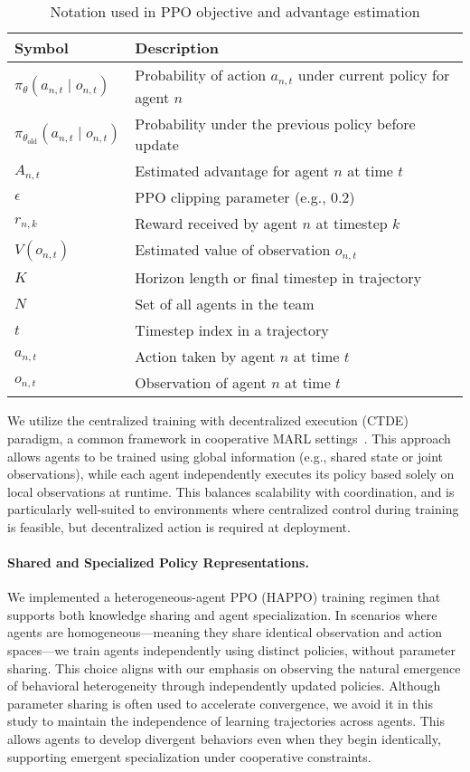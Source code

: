 \documentclass{article}
\begin{document}
\begin{table}[h]
    \centering
    \caption{Notation used in PPO objective and advantage estimation}
    \begin{tabular}{ll}
    \toprule
    \textbf{Symbol} & \textbf{Description} \\
    \midrule
    $\pi_\theta(a_{n,t} \mid o_{n,t})$ & Probability of action $a_{n,t}$ under current policy for agent $n$ \\
    $\pi_{\theta_{\text{old}}}(a_{n,t} \mid o_{n,t})$ & Probability under the previous policy before update \\
    $\hat{A}_{n,t}$ & Estimated advantage for agent $n$ at time $t$ \\
    $\epsilon$ & PPO clipping parameter (e.g., 0.2) \\
    $r_{n,k}$ & Reward received by agent $n$ at timestep $k$ \\
    $V(o_{n,t})$ & Estimated value of observation $o_{n,t}$ \\
    $K$ & Horizon length or final timestep in trajectory \\
    $N$ & Set of all agents in the team \\
    $t$ & Timestep index in a trajectory \\
    $a_{n,t}$ & Action taken by agent $n$ at time $t$ \\
    $o_{n,t}$ & Observation of agent $n$ at time $t$ \\
    \bottomrule
    \end{tabular}
\end{table}

We utilize the centralized training with decentralized execution (CTDE) paradigm, 
a common framework in cooperative MARL settings~\cite{guo2024}. 
This approach allows agents to be trained using global information 
(e.g., shared state or joint observations), while each agent independently 
executes its policy based solely on local observations at runtime. 
This balances scalability with coordination, and is particularly well-suited 
to environments where centralized control during training is feasible, 
but decentralized action is required at deployment.

\paragraph{Shared and Specialized Policy Representations.} 
We implemented a heterogeneous-agent PPO (HAPPO) training regimen that supports both 
knowledge sharing and agent specialization. In scenarios where agents are 
homogeneous—meaning they share identical observation and action spaces—we train agents 
independently using distinct policies, without parameter sharing. 
This choice aligns with our emphasis on observing the natural emergence of 
behavioral heterogeneity through independently updated policies. 
Although parameter sharing is often used to accelerate convergence, 
we avoid it in this study to maintain the independence of learning trajectories across agents. 
This allows agents to develop divergent behaviors even when they begin identically, 
supporting emergent specialization under cooperative constraints.
\end{document}
